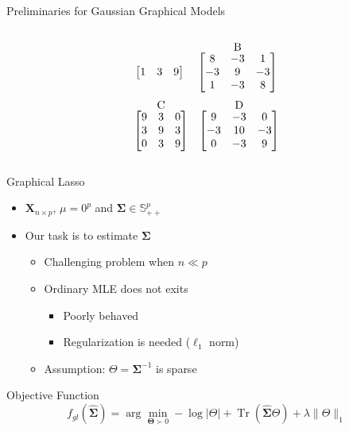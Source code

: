 \documentclass{beamer}
\begin{document}
\begin{frame}{Preliminaries for Gaussian Graphical Models}
\begin{columns}
\begin{column}{0.48\textwidth}
\[{\begin{bmatrix}
            1 & 3 & 9
          \end{bmatrix}%
        } \quad
        \stackrel{\mbox{B}}{%
          \begin{bmatrix}
            8 & -3 & 1 \\
            -3 & 9 & -3 \\
            1 & -3 & 8
          \end{bmatrix}%
        }
      \]
      \[
        \stackrel{\mbox{C}}{%
          \begin{bmatrix}
            9 & 3 & 0 \\
            3 & 9 & 3 \\
            0 & 3 & 9
          \end{bmatrix}%
        } \quad
        \stackrel{\mbox{D}}{%
          \begin{bmatrix}
            9 & -3 & 0 \\
            -3 & 10 & -3 \\
            0 & -3 & 9
          \end{bmatrix}%
        }
      \]
    \end{column}
  \end{columns}
\end{frame}
\begin{frame}{Graphical Lasso}
  \begin{itemize}
  \item $\mathbf { X } _ { n \times p }$, $\mu=0^p$ and $\mathbf{\Sigma} \in
    \mathbf { \mathbb{S} } _ { + + } ^ { p }$
  \item Our task is to estimate $\mathbf{\Sigma}$
    \begin{itemize}
    \item Challenging problem when $n \ll p$
    \item Ordinary MLE does not exits
      \begin{itemize}
      \item Poorly behaved
      \item Regularization is needed ($\ell _ { 1 }$ norm)
      \end{itemize}
    \item Assumption: $\Theta = \mathbf{\Sigma} ^ { - 1 }$ is sparse
    \end{itemize}
  \end{itemize}
  \begin{block}{Objective Function}
    \[
      f _ { g l } ( \hat { \boldsymbol { \Sigma } } ) = \arg \min _ { \mathbf { \Theta } \succ 0 } - \log | \Theta | + \operatorname { Tr } ( \hat { \mathbf { \Sigma } } \Theta ) + \lambda \| \Theta \| _ { 1 }
    \]
  \end{block}
\end{frame}
\end{document}
